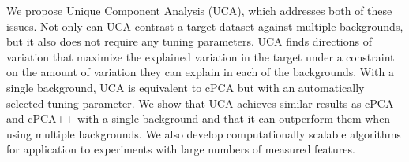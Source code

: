 \documentclass[12pt]{article}
\begin{document}
We propose Unique Component Analysis (UCA), which addresses both of these issues. %
Not only can UCA contrast a target dataset against multiple backgrounds, but it also does not require any tuning parameters. UCA finds directions of variation that maximize the explained variation in the target under a constraint on the amount of variation they can explain in each of the backgrounds. With a single background, UCA is equivalent to cPCA but with an automatically selected tuning parameter. We show that UCA achieves similar results as cPCA and cPCA++ with a single background and that it can outperform them when using multiple backgrounds. We also develop computationally scalable algorithms for application to experiments with large numbers of measured features.
\end{document}
